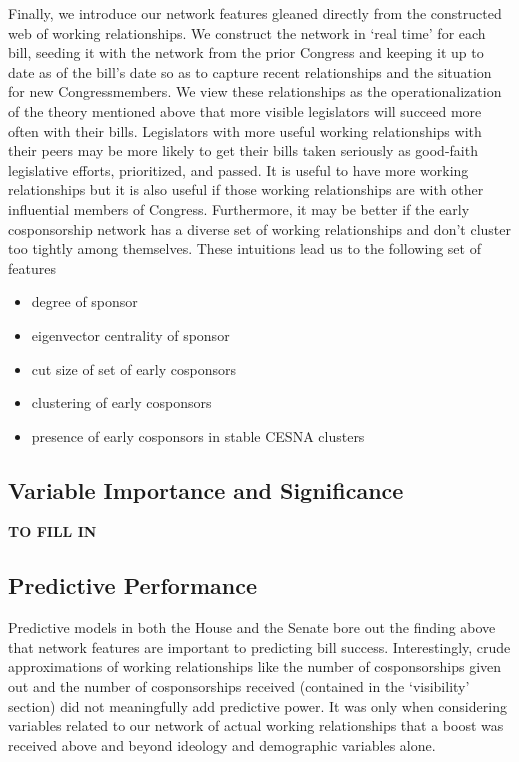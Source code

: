 Finally, we introduce our network features gleaned directly from the constructed
web of working relationships. We construct the network in `real time' for each
bill, seeding it with the network from the prior Congress and keeping it up to
date as of the bill's date so as to capture recent relationships and the
situation for new Congressmembers. We view these relationships as the
operationalization of the theory mentioned above that more visible legislators
will succeed more often with their bills. Legislators with more useful working
relationships with their peers may be more likely to get their bills taken
seriously as good-faith legislative efforts, prioritized, and passed. It is
useful to have more working relationships but it is also useful if those working
relationships are with other influential members of Congress. Furthermore, it
may be better if the early cosponsorship network has a diverse set of working
relationships and don't cluster too tightly among themselves. These intuitions
lead us to the following set of features
\begin{itemize}
	\item degree of sponsor
	\item eigenvector centrality of sponsor
	\item cut size of set of early cosponsors
	\item clustering of early cosponsors
	\item presence of early cosponsors in stable CESNA clusters
\end{itemize}

\subsection{Variable Importance and Significance}

\textbf{TO FILL IN}

\subsection{Predictive Performance}

Predictive models in both the House and the Senate bore out the finding above that network features are important to predicting bill success. Interestingly, crude approximations of working relationships like the number of cosponsorships given out and the number of cosponsorships received (contained in the `visibility' section) did not meaningfully add predictive power. It was only when considering variables related to our network of actual working relationships that a boost was received above and beyond ideology and demographic variables alone.


